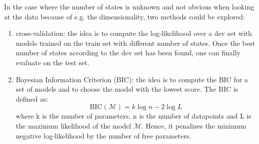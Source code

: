 \documentclass{article}
\begin{document}
In the case where the number of states is unknown and not obvious when looking at the data because of e.g. the dimensionality, two methods could be explored:
\begin{enumerate}[label=(\roman*)]
\item cross-validation: the idea is to compute the log-likelihood over a dev set with models trained on the train set with different number of states. Once the best number of states according to the dev set has been found, one can finally evaluate on the test set.
\item Bayesian Information Criterion (BIC): the idea is to compute the BIC for a set of models and to choose the model with the lowest score. The BIC is defined as:
$$
\text{BIC}(\mathcal{M}) = k\log n - 2\log L
$$
where k is the number of parameters, n is the number of datapoints and L is the maximum likelihood of the model $\mathcal{M}$. Hence, it penalizes the minimum negative log-likelihood by the number of free parameters.
\end{enumerate}
\end{document}
